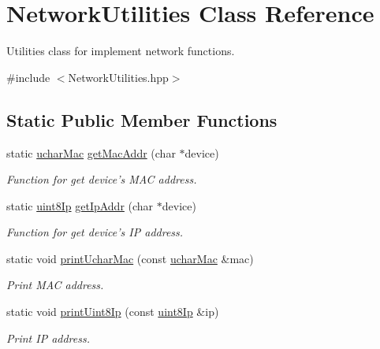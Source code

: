 \hypertarget{class_network_utilities}{\section{Network\-Utilities Class Reference}
\label{class_network_utilities}
}


Utilities class for implement network functions.  




{\ttfamily \#include $<$Network\-Utilities.\-hpp$>$}

\subsection*{Static Public Member Functions}
\begin{DoxyCompactItemize}
\item 
static \hyperlink{structuchar_mac}{uchar\-Mac} \hyperlink{class_network_utilities_a87db387fab10438ff356516d46486709}{get\-Mac\-Addr} (char $\ast$device)
\begin{DoxyCompactList}\small\item\em Function for get device's M\-A\-C address. \end{DoxyCompactList}\item 
static \hyperlink{structuint8_ip}{uint8\-Ip} \hyperlink{class_network_utilities_a3340be51030cb7994e377ea4be24a5a9}{get\-Ip\-Addr} (char $\ast$device)
\begin{DoxyCompactList}\small\item\em Function for get device's I\-P address. \end{DoxyCompactList}\item 
static void \hyperlink{class_network_utilities_a37f086940e09f6ea44041b687f086ed0}{print\-Uchar\-Mac} (const \hyperlink{structuchar_mac}{uchar\-Mac} \&mac)
\begin{DoxyCompactList}\small\item\em Print M\-A\-C address. \end{DoxyCompactList}\item 
static void \hyperlink{class_network_utilities_a324f12256f9e027a816fd6dd59419f51}{print\-Uint8\-Ip} (const \hyperlink{structuint8_ip}{uint8\-Ip} \&ip)
\begin{DoxyCompactList}\small\item\em Print I\-P address. \end{DoxyCompactList}\end{DoxyCompactItemize}


